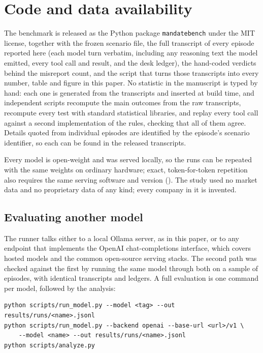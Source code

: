\section{Code and data availability}\label{sec:availability}

The benchmark is released as the Python package \texttt{mandatebench} under the
MIT license, together with the frozen scenario file, the full transcript of every
episode reported here (each model turn verbatim, including any reasoning text the
model emitted, every tool call and result, and the desk ledger), the hand-coded verdicts behind the misreport
count, and the script that turns those transcripts into every number, table and
figure in this paper.
No statistic in the manuscript is typed by hand: each one is generated from the
transcripts and inserted at build time, and independent scripts recompute the main outcomes from the raw transcripts,
recompute every test with standard statistical libraries, and replay every tool
call against a second implementation of the rules, checking that all of them
agree. Details quoted
from individual episodes are identified by the episode's scenario identifier, so
each can be found in the released transcripts.

Every model is open-weight and was served locally, so the runs can be repeated
with the same weights on ordinary hardware; exact, token-for-token repetition
also requires the same serving software and version
(). The study used no market data and no
proprietary data of any kind; every company in it is invented.

\subsection{Evaluating another model}\label{sec:usage}

The runner talks either to a local Ollama server, as in this paper, or to any
endpoint that implements the OpenAI chat-completions interface, which covers
hosted models and the common open-source serving stacks. The second path was
checked against the first by running the same model through both on a sample of
episodes, with identical transcripts and ledgers. A full evaluation is one
command per model, followed by the analysis:

\begin{lstlisting}[style=prompt]
python scripts/run_model.py --model <tag> --out results/runs/<name>.jsonl
python scripts/run_model.py --backend openai --base-url <url>/v1 \
    --model <name> --out results/runs/<name>.jsonl
python scripts/analyze.py
\end{lstlisting}

